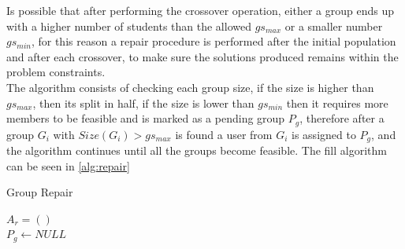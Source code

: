 Is possible that after performing the crossover operation, either a group ends up with a higher number of students than the allowed $gs_{max}$ or a smaller number $gs_{min}$, for this reason a repair procedure is performed after the initial population and after each crossover, to make sure the solutions produced remains within the problem constraints.\\

The algorithm consists of checking each group size, if the size is higher than $gs_{max}$, then its split in half, if the size is lower than $gs_{min}$ then it requires more members to be feasible and is marked as a pending group $P_g$, therefore after a group $G_i$ with $Size(G_i) > gs_{max}$ is found a user from $G_i$ is assigned to $P_g$, and the algorithm continues until all the groups become feasible.
The fill algorithm can be seen in \ref{alg:repair}

\begin{algorithm}[H]
    \caption{Group Repair}
    \label{alg:repair}
    \SetAlgoLined 
    $A_r = ()$\;\\
    $P_g \leftarrow NULL$\;\\
\end{algorithm}

